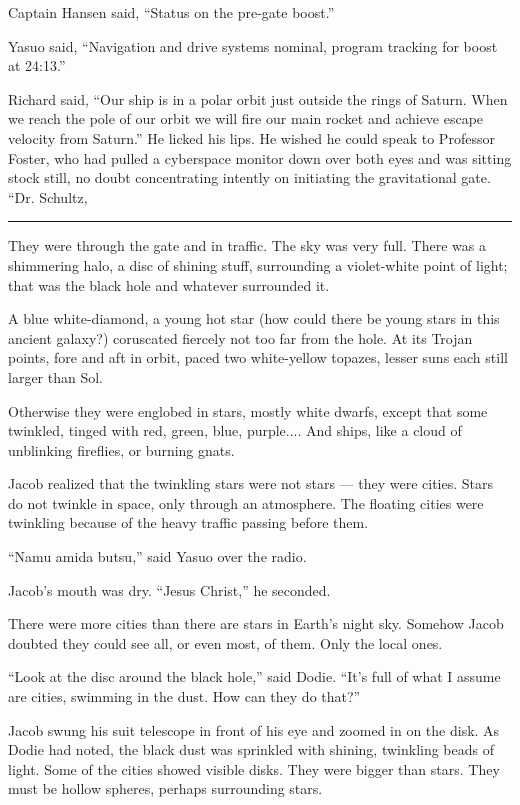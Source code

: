 \documentclass[english,11pt,letterpaper,onecolumn]{scrbook}
\begin{document}
	Captain Hansen said, ``Status on the pre-gate boost.''

	Yasuo said, ``Navigation and drive systems nominal, program tracking for boost at 24:13.''

	Richard said, ``Our ship is in a polar orbit just outside the rings of Saturn.  When we reach the pole of our orbit we will fire our main rocket and achieve escape velocity from Saturn.''  He licked his lips.  He wished he could speak to Professor Foster, who had pulled a cyberspace monitor down over both eyes and was sitting stock still, no doubt concentrating intently on initiating the gravitational gate.  ``Dr. Schultz, 

\begin{center}\rule[3pt]{2in}{0.5pt}\end{center}

	They were through the gate and in traffic.  The sky was very full.  There was a shimmering halo, a disc of shining stuff, surrounding a violet-white point of light; that was the black hole and whatever surrounded it.

	A blue white-diamond, a young hot star (how could there be young stars in this ancient galaxy?) coruscated fiercely not too far from the hole.  At its Trojan points, fore and aft in orbit, paced two white-yellow topazes, lesser suns each still larger than Sol.

	Otherwise they were englobed in stars, mostly white dwarfs, except that some twinkled, tinged with red, green, blue, purple....  And ships, like a cloud of unblinking fireflies, or burning gnats.

	Jacob realized that the twinkling stars were not stars --- they were cities.  Stars do not twinkle in space, only through an atmosphere.  The floating cities were twinkling because of the heavy traffic passing before them.

	``Namu amida butsu,'' said Yasuo over the radio.

	Jacob's mouth was dry.  ``Jesus Christ,'' he seconded.

	There were more cities than there are stars in Earth's night sky.  Somehow Jacob doubted they could see all, or even most, of them.  Only the local ones.

	``Look at the disc around the black hole,'' said Dodie.  ``It's full of what I assume are cities, swimming in the dust.  How can they do that?''

	Jacob swung his suit telescope in front of his eye and zoomed in on the disk.  As Dodie had noted, the black dust was sprinkled with shining, twinkling beads of light.  Some of the cities showed visible disks.  They were bigger than stars.  They must be hollow spheres, perhaps surrounding stars.
\end{document}
